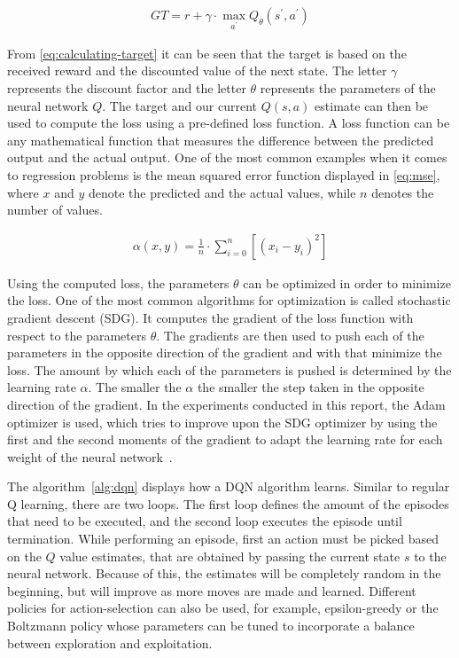 \documentclass{article}
\begin{document}
\begin{align}
   \label{eq:calculating-target}
    GT = r + \gamma \cdot \max_{a^\prime} Q_{\theta}(s^\prime, a^\prime)
\end{align}

From \autoref{eq:calculating-target} it can be seen that the target is based on the received reward and the discounted
value of the next state.
The letter $\gamma$ represents the discount factor and the letter $\theta$ represents the parameters of the neural network $Q$.
The target and our current $Q(s,a)$ estimate can then be used to compute the loss using a pre-defined loss function.
A loss function can be any mathematical function that measures the difference between the predicted output and the
actual output.
One of the most common examples when it comes to regression problems is the mean squared error function displayed
in \autoref{eq:mse}, 
where $x$ and $y$ denote the predicted and the actual values, while $n$ denotes the number of values.

\begin{align}
   \label{eq:mse}
   \alpha(x, y) = \frac{1}{n} \cdot \sum_{i = 0}^{n} [(x_i - y_i)^2]
\end{align}

Using the computed loss, the parameters $\theta$ can be optimized in order to minimize the loss.
One of the most common algorithms for optimization is called stochastic gradient descent (SDG).
It computes the gradient of the loss function with respect to the parameters $\theta$.
The gradients are then used to push each of the parameters in the opposite direction of the gradient and with that minimize
the loss.
The amount by which each of the parameters is pushed is determined by the learning rate $\alpha$.
The smaller the $\alpha$ the smaller the step taken in the opposite direction of the gradient.
In the experiments conducted in this report, the Adam optimizer is used, which tries to improve upon the SDG optimizer
by using the first and the second moments of the gradient to adapt the learning rate for each weight
of the neural network~\cite{kingma2014adam}.

The algorithm~\ref{alg:dqn} displays how a DQN algorithm learns.
Similar to regular Q learning, there are two loops.
The first loop defines the amount of the episodes that need to be executed, and the second loop executes
the episode until termination.
While performing an episode, first an action must be picked based on the $Q$ value estimates,
that are obtained by passing the current state $s$ to the neural network.
Because of this, the estimates will be completely random in the beginning, but will improve as more moves are made and learned.
Different policies for action-selection can also be used, for example, epsilon-greedy or the Boltzmann policy
whose parameters can be tuned to incorporate a balance between exploration and exploitation.
\end{document}

